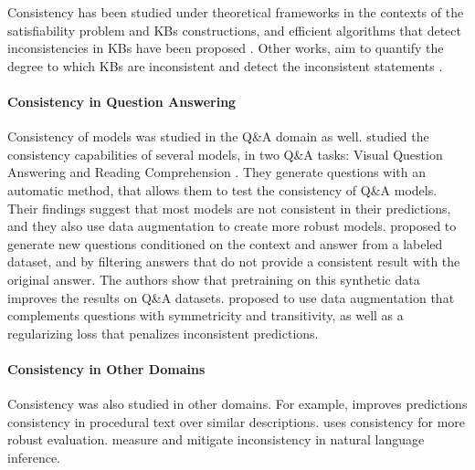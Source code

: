 Consistency has been studied under theoretical frameworks in the contexts of the satisfiability problem and KBs constructions, and efficient algorithms that detect inconsistencies in KBs have been proposed \cite{hansen2000probabilistic,andersen2001easy}.
Other works, aim to quantify the degree to which KBs are inconsistent and detect the inconsistent statements \cite{Thimm:2009d,muino2011measuring,Thimm:2013}.



\paragraph{Consistency in Question Answering}
Consistency of models was studied in the Q\&A domain as well. \citet{ribeiro-etal-2019-red} studied the consistency capabilities of several models, in two Q\&A tasks: Visual Question Answering \cite{vqa} and Reading Comprehension \cite{squad}. They generate questions with an automatic method, that allows them to test the consistency of Q\&A models.
Their findings suggest that most models are not consistent in their predictions, and they also use data augmentation to create more robust models.
\citet{alberti2019synthetic} proposed to generate new questions conditioned on the context and answer from a labeled dataset, and by filtering answers that do not provide a consistent result with the original answer. The authors show that pretraining on this synthetic data improves the results on Q\&A datasets.
\citet{consistent-qa} proposed to use data augmentation that complements questions with symmetricity and transitivity, as well as a regularizing loss that penalizes inconsistent predictions.

\paragraph{Consistency in Other Domains}
Consistency was also studied in other domains. For example, \citet{du2019consistent} improves predictions consistency in procedural text over similar descriptions. \citet{ribeiro-etal-2020-beyond} uses consistency for more robust evaluation. \citet{li-etal-2019-logic} measure and mitigate inconsistency in natural language inference.

